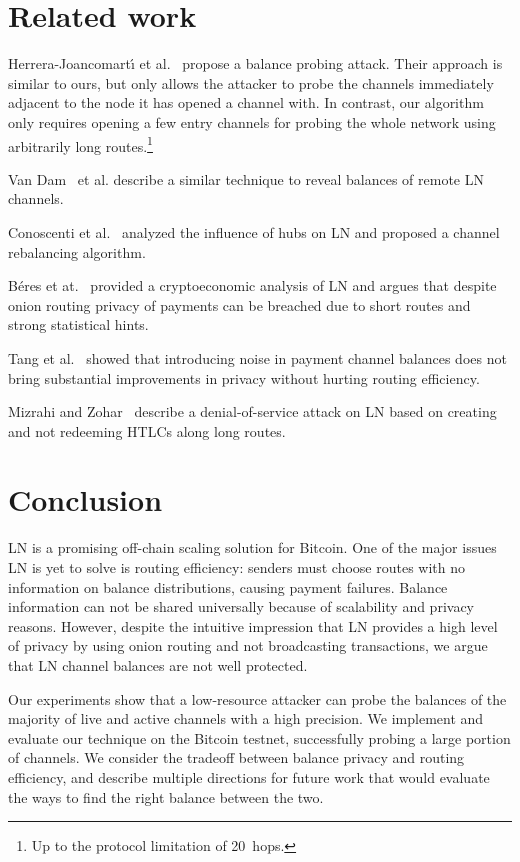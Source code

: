 \section{Related work} \label{sec:related-work}
Herrera{-}Joancomart{\'{\i}} et al.~\cite{HerreraJoancomarti2019} propose a balance probing attack.
Their approach is similar to ours, but only allows the attacker to probe the channels immediately adjacent to the node it has opened a channel with.
In contrast, our algorithm only requires opening a few entry channels for probing the whole network using arbitrarily long routes.\footnote{Up to the protocol limitation of 20~hops.}

Van Dam~\cite{Dam2019} et al. describe a similar technique to reveal balances of remote LN channels.

Conoscenti et al.~\cite{Conoscenti2019} analyzed the influence of hubs on LN and proposed a channel rebalancing algorithm.

B{\'{e}}res et at.~\cite{Beres2019} provided a cryptoeconomic analysis of LN and argues that despite onion routing privacy of payments can be breached due to short routes and strong statistical hints.

Tang et al.~\cite{Tang2019} showed that introducing noise in payment channel balances does not bring substantial improvements in privacy without hurting routing efficiency.

Mizrahi and Zohar~\cite{Mizrahi2020} describe a denial-of-service attack on LN based on creating and not redeeming HTLCs along long routes.


\section{Conclusion} \label{sec:conclusion}
LN is a promising off-chain scaling solution for Bitcoin.
One of the major issues LN is yet to solve is routing efficiency: senders must choose routes with no information on balance distributions, causing payment failures.
Balance information can not be shared universally because of scalability and privacy reasons.
However, despite the intuitive impression that LN provides a high level of privacy by using onion routing and not broadcasting transactions, we argue that LN channel balances are not well protected.

Our experiments show that a low-resource attacker can probe the balances of the majority of live and active channels with a high precision.
We implement and evaluate our technique on the Bitcoin testnet, successfully probing a large portion of channels.
We consider the tradeoff between balance privacy and routing efficiency, and describe multiple directions for future work that would evaluate the ways to find the right balance between the two.

